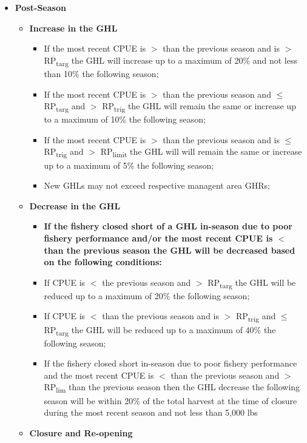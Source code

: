 \documentclass[]{article}
\providecommand{\tightlist}{%
  \setlength{\itemsep}{0pt}\setlength{\parskip}{0pt}}
\begin{document}
\begin{itemize}
\tightlist
\item
  \textbf{Post-Season }

  \begin{itemize}
  \tightlist
  \item
    \textbf{Increase in the GHL}

    \begin{itemize}
    \tightlist
    \item
      If the most recent CPUE is \(>\) than the previous season and is
      \(>\) RP\textsubscript{targ} the GHL will increase up to a maximum
      of 20\% and not less than 10\% the following season;
    \item
      If the most recent CPUE is \(>\) than the previous season and
      \(\leq\) RP\textsubscript{targ} and \(>\) RP\textsubscript{trig}
      the GHL will remain the same or increase up to a maximum of 10\%
      the following season;
    \item
      If the most recent CPUE is \(>\) than the previous season and is
      \(\leq\) RP\textsubscript{trig} and \(>\) RP\textsubscript{limit}
      the GHL will will remain the same or increase up to a maximum of
      5\% the following season;
    \item
      New GHLs may not exceed respective managent area GHRs;
    \end{itemize}
  \item
    \textbf{Decrease in the GHL}

    \begin{itemize}
    \tightlist
    \item
      \textbf{If the fishery closed short of a GHL in-season due to poor
      fishery performance and/or the most recent CPUE is \(<\) than the
      previous season the GHL will be decreased based on the following
      conditions:}
    \item
      If CPUE is \(<\) the previous season and \(>\)
      RP\textsubscript{targ} the GHL will be reduced up to a maximum of
      20\% the following season;
    \item
      If CPUE is \(<\) than the previous season and is \(>\)
      RP\textsubscript{trig} and \(\leq\) RP\textsubscript{targ} the GHL
      will be reduced up to a maximum of 40\% the following season;
    \item
      If the fishery closed short in-season due to poor fishery
      performance and the most recent CPUE is \(<\) than the previous
      season and \(>\) RP\textsubscript{lim} than the previous season
      then the GHL decrease the following season will be within 20\% of
      the total harvest at the time of closure during the most recent
      season and not less than 5,000 lbs
    \end{itemize}
  \item
    \textbf{Closure and Re-opening}


\end{itemize}
\end{itemize}
\end{document}
